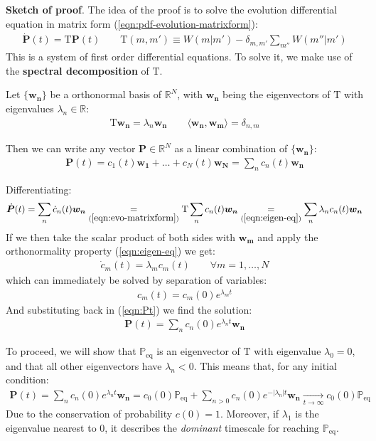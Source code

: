 \documentclass[../../main.tex]{subfiles}
\begin{document}
\medskip

\textbf{Sketch of proof}. 
The idea of the proof is to solve the evolution differential equation in matrix form (\ref{eqn:pdf-evolution-matrixform}):
\begin{align}\label{eqn:evo-matrixform}
    \dot{\bm{P}}(t) = \mathrm{T} \bm{P}(t) \qquad \mathrm{T}(m,m') \equiv W(m|m') - \delta_{m,m'} \sum_{m''} W(m''|m')
\end{align}
This is a system of first order differential equations. To solve it, we make use of the \textbf{spectral decomposition} of $\mathrm{T}$.

Let $\{\bm{w_n}\}$ be a orthonormal basis of $\mathbb{R}^N$, with $\bm{w_n}$ being the eigenvectors of $\mathrm{T}$ with eigenvalues $\lambda_n \in \mathbb{R}$:
\begin{align}\label{eqn:eigen-eq}
    \mathrm{T} \bm{w_n} = \lambda_n \bm{w_n} \qquad \langle \bm{w_n}, \bm{w_m} \rangle = \delta_{n,m}
\end{align}

Then we can write any vector $\bm{P} \in \mathbb{R}^N$ as a linear combination of $\{\bm{w_n}\}$:
\begin{align}\label{eqn:Pt}
    \bm{P}(t) = c_1(t) \bm{w_1} + \dots + c_N(t) \bm{w_N} = \sum_{n} c_n(t) \bm{w_n}
\end{align}

Differentiating:
\begin{align*}
    \dot{\bm{P}}(t) = \sum_n \dot{c}_n(t) \bm{w_n} \underset{(\ref{eqn:evo-matrixform})}{=}  \mathrm{T} \sum_{n} c_n(t) \bm{w_n} \underset{(\ref{eqn:eigen-eq})}{=} \sum_n \lambda_n c_n(t) \bm{w_n} 
\end{align*}
If we then take the scalar product of both sides with $\bm{w_m}$ and apply the orthonormality property (\ref{eqn:eigen-eq}) we get:
\begin{align*}
    \dot{c}_m(t) = \lambda_m c_m(t) \qquad \forall m = 1,\dots,N
\end{align*}
which can immediately be solved by separation of variables:
\begin{align*}
    c_m(t) = c_m(0) e^{\lambda_m t}
\end{align*}
And substituting back in (\ref{eqn:Pt}) we find the solution:
\begin{align*}
    \bm{P}(t) = \sum_n c_n(0) e^{\lambda_n t} \bm{w_n}
\end{align*}

To proceed, we will show that $\mathbb{P}_{\mathrm{eq}}$ is an eigenvector of $\mathrm{T}$ with eigenvalue $\lambda_0 = 0$, and that all other eigenvectors have $\lambda_n < 0$. This means that, for any initial condition:
\begin{align*}
    \bm{P}(t) = \sum_n c_n(0) e^{\lambda_n t} \bm{w_n} = c_0(0) \mathbb{P}_{\mathrm{eq}} + \sum_{n > 0} c_n(0) e^{-|\lambda_n|t} \bm{w_n}  \xrightarrow[t \to \infty]{}  c_0(0) \mathbb{P}_{\mathrm{eq}}
\end{align*}
Due to the conservation of probability $c(0) = 1$. Moreover, if $\lambda_1$ is the eigenvalue nearest to $0$, it describes the \textit{dominant} timescale for reaching $\mathbb{P}_{\mathrm{eq}}$. 
\end{document}

